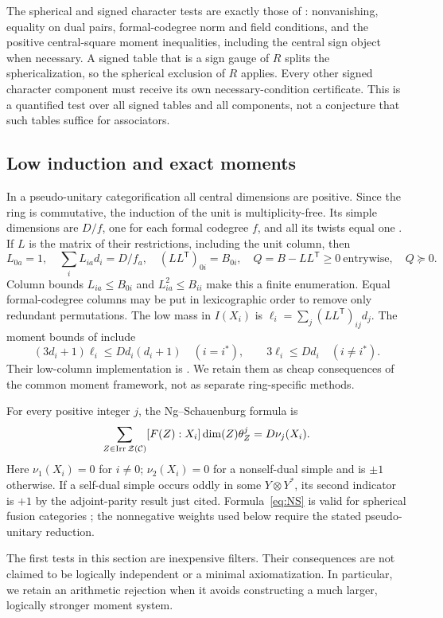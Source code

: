 The spherical and signed character tests are exactly those of
\cite[Sections 2, 6--7]{DP}: nonvanishing, equality on dual pairs,
formal-codegree norm and field conditions, and the positive central-square
moment inequalities, including the central sign object when necessary.
A signed table that is a sign gauge of $R$ splits the sphericalization,
so the spherical exclusion of $R$ applies. Every other signed character
component must receive its own necessary-condition certificate. This
is a quantified test over all signed tables and all components, not a
conjecture that such tables suffice for associators.

\subsection{Low induction and exact moments}
In a pseudo-unitary categorification all central dimensions are positive.
Since the ring is commutative, the induction of the unit is
multiplicity-free. Its simple dimensions are $D/f$, one for each formal
codegree $f$, and all its twists equal one
\cite[Theorem 2.13]{Ostrik}. If $L$ is the matrix of their restrictions,
including the unit column, then
\begin{equation}\label{eq:low}
 L_{0a}=1,\quad \sum_iL_{ia}d_i=D/f_a,\quad
 (LL^{\mathsf T})_{0i}=B_{0i},\quad
 Q=B-LL^{\mathsf T}\ge0\ \text{entrywise},\quad Q\succeq0.
\end{equation}
Column bounds $L_{ia}\le B_{0i}$ and $L_{ia}^2\le B_{ii}$ make this a
finite enumeration. Equal formal-codegree columns may be put in
lexicographic order to remove only redundant permutations.
The low mass in $I(X_i)$ is
$\ell_i=\sum_j(LL^{\mathsf T})_{ij}d_j$.
The moment bounds of \cite[Theorem 3.1 and Proposition 3.2]{DP} include
\begin{equation}\label{eq:low-moment}
 (3d_i+1)\ell_i\le Dd_i(d_i+1)\quad(i=i^*),
 \qquad 3\ell_i\le Dd_i\quad(i\ne i^*).
\end{equation}
Their low-column implementation is \cite[Proposition 3.3]{DP}.
We retain them as cheap consequences of the common moment framework,
not as separate ring-specific methods.

For every positive integer $j$, the Ng--Schauenburg formula is
\begin{equation}\label{eq:NS}
 \sum_{Z\in\operatorname{Irr}\mathcal Z(\mathcal C)}[F(Z):X_i]\dim(Z)\theta_Z^j
   =D\nu_j(X_i).
\end{equation}
Here $\nu_1(X_i)=0$ for $i\ne0$; $\nu_2(X_i)=0$ for a nonself-dual
simple and is $\pm1$ otherwise. If a self-dual simple occurs oddly in
some $Y\otimes Y^*$, its second indicator is $+1$ by the adjoint-parity
result just cited. Formula~\eqref{eq:NS} is valid for spherical fusion
categories \cite[Theorem 4.1]{NS}; the nonnegative weights used below
require the stated pseudo-unitary reduction.

The first tests in this section are inexpensive filters. Their
consequences are not claimed to be logically independent or a minimal
axiomatization. In particular, we retain an arithmetic rejection when
it avoids constructing a much larger, logically stronger moment system.
